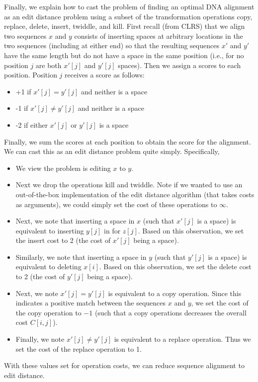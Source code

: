 \documentclass[paper=a4, fontsize=11pt]{scrartcl} %
\numberwithin{equation}{section} %
\numberwithin{figure}{section} %
\numberwithin{table}{section} %
\begin{document}
Finally, we explain how to cast the problem of finding an optimal DNA alignment as an edit distance problem using a subset of the transformation operations copy, replace, delete, insert, twiddle, and kill. First recall (from CLRS) that we align two sequences $x$ and $y$ consists of inserting spaces at arbitrary locations in the two sequences (including at either end) so that the resulting sequences $x'$ and $y'$ have the same length but do not have a space in the same position (i.e., for no position $j$ are both $x'[j]$ and $y'[j]$ spaces). Then we assign a scores to each position. Position $j$ receives a score as follows:
\begin{itemize}
\item +1 if $x'[j] = y'[j]$ and neither is a space
\item -1 if $x'[j] \ne y'[j]$ and neither is a space
\item -2 if either $x'[j]$ or $y'[j]$ is a space
\end{itemize}
Finally, we sum the scores at each position to obtain the score for the alignment. \\
We can cast this as an edit distance problem quite simply. Specifically,
\begin{itemize}
\item We view the problem is editing $x$ to $y$. 
\item Next we drop the operations kill and twiddle. Note if we wanted to use an out-of-the-box implementation of the edit distance algorithm (that takes costs as arguments), we could simply set the cost of these operations to $\infty$. 
\item Next, we note that inserting a space in $x$ (such that $x'[j]$ is a space) is equivalent to inserting $y[j]$ in for $z[j]$. Based on this observation, we set the insert cost to 2 (the cost of $x'[j]$ being a space).
\item Similarly, we note that inserting a space in $y$ (such that $y'[j]$ is a space) is equivalent to deleting $x[i]$. Based on this observation, we set the delete cost to 2 (the cost of $y'[j]$ being a space).
\item Next, we note $x'[j] = y'[j]$ is equivalent to a copy operation. Since this indicates a positive match between the sequences $x$ and $y$, we set the cost of the copy operation to $-1$ (such that a copy operations decreases the overall cost $C[i,j]$).
\item Finally, we note $x'[j] \ne y'[j]$ is equivalent to a replace operation. Thus we set the cost of the replace operation to 1.
\end{itemize}

With these values set for operation costs, we can reduce sequence alignment to edit distance.

\end{document}
